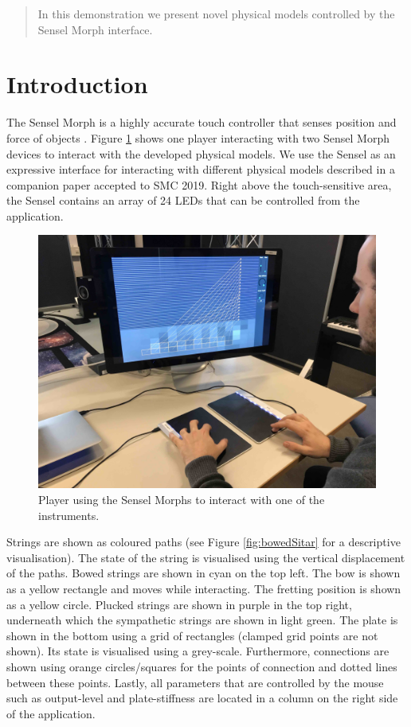 \begin{abstract}
    In this demonstration we present novel physical models controlled by the Sensel Morph interface.
    \end{abstract}
    
    \section{Introduction}\label{sec:introduction}
    The Sensel Morph is a highly accurate touch controller that senses position and force of objects \cite{sensel2018}.  Figure \ref{fig:sensel} shows one player interacting with two Sensel Morph devices to interact with the developed physical models.
    We use the Sensel as an expressive interface for interacting with different physical models described in a companion paper accepted to SMC 2019. Right above the touch-sensitive area, the Sensel contains an array of 24 LEDs that can be controlled from the application.
    \begin{figure}[h]\includegraphics[width=\paperFigWidth\textwidth]{figures/senselLQ.jpg}\centering
    \caption{Player using the Sensel Morphs to interact with one of the instruments.\label{fig:sensel}}
    \end{figure}
    
    Strings are shown as coloured paths (see Figure \ref{fig:bowedSitar} for a descriptive visualisation). The state of the string is visualised using the vertical displacement of the paths. Bowed strings are shown in cyan on the top left. The bow is shown as a yellow rectangle and moves while interacting.
    The fretting position is shown as a yellow circle. Plucked strings are shown in purple in the top right, underneath which the sympathetic strings are shown in light green. The plate is shown in the bottom using a grid of rectangles (clamped grid points are not shown). Its state is visualised using a grey-scale. Furthermore, connections are shown using orange circles/squares for the points of connection and dotted lines between these points. Lastly, all parameters that are controlled by the mouse such as output-level and plate-stiffness are located in a column on the right side of the application.
    
